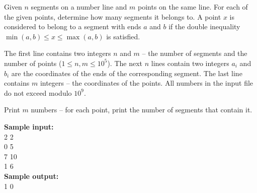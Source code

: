 \documentclass[a4paper]{article}
\begin{document}
Given $n$ segments on a number line and $m$ points on the same line. For each of the given points, determine how many segments it belongs to. A point $x$ is considered to belong to a segment with ends $a$ and $b$ if the double inequality $\min(a, b) \le x \le \max(a, b)$ is satisfied.

The first line contains two integers $n$ and $m$ -- the number of segments and the number of points ($1 \le n, m \le 10^5$). The next $n$ lines contain two integers $a_i$ and $b_i$ are the coordinates of the ends of the corresponding segment. The last line contains $m$ integers -- the coordinates of the points. All numbers in the input file do not exceed modulo $10^9$.

Print $m$ numbers -- for each point, print the number of segments that contain it.

\LINE

\noindent \textbf{Sample input:}\\
2 2\\
0 5\\
7 10\\
1 6\\


\noindent \textbf{Sample output:}\\
1 0\\
\end{document}
